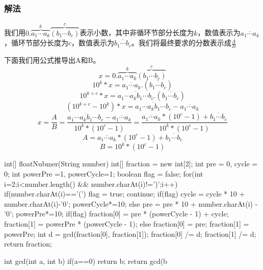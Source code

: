 \subsubsection{解法}

我们用$0.\overbrace{a_1 \cdots a_k}^{k} \overbrace{(b_1 \cdots b_c)}^{c}$表示小数，其中非循环节部分长度为$k$，数值表示为$\overline{a_1 \cdots a_k}$，循环节部分长度为$c$，数值表示为$\overline{b_1 \cdots b_c}$。我们将最终要求的分数表示成$\frac{A}{B}$

下面我们用公式推导出A和B。
\[ x = 0.\overbrace{a_1 \cdots a_k}^{k} \overbrace{(b_1 \cdots b_c)}^{c}  \]
\[ 10^k*x = \overline{a_1 \cdots a_k}.(\overline{b_1 \cdots b_c}) \]
\[ 10^{k+c}*x = \overline{a_1 \cdots a_kb_1 \cdots b_c}.(\overline{b_1 \cdots b_c}) \]
\[ (10^{k+c}-10^{k}) * x = \overline{a_1 \cdots a_kb_1 \cdots b_c}-\overline{a_1 \cdots a_k} \]
\[ x = \frac{A}{B} = \frac{\overline{a_1 \cdots a_kb_1 \cdots b_c}-\overline{a_1 \cdots a_k}}{10^k*(10^c-1)} = \frac{\overline{a_1 \cdots a_k}*(10^c-1) + \overline{b_1 \cdots b_c}}{10^k*(10^c-1)} \]
\[ A = \overline{a_1 \cdots a_k}*(10^c-1) + \overline{b_1 \cdots b_c} \]
\[ B = 10^k*(10^c-1) \]
\begin{Codex}[label={[$O(N)+O(1)$]Chap02_06_FloatNumber.java}]
int[] floatNubmer(String number) {
    int[] fraction = new int[2];
    int pre = 0, cycle = 0;
    int powerPre =1, powerCycle=1;
    boolean flag = false;
    for(int i=2;i<number.length() && number.charAt(i)!=')';i++) {
        if(number.charAt(i)=='(') {
            flag = true;
            continue;
        }
        if(flag) {
            cycle = cycle * 10 + number.charAt(i)-'0';
            powerCycle*=10;
         } else {
            pre = pre * 10 + number.charAt(i) - '0';
            powerPre*=10;
        }
    }
    if(flag) {
        fraction[0] = pre * (powerCycle - 1) + cycle;
        fraction[1] = powerPre * (powerCycle - 1);
    } else {
        fraction[0] = pre;
        fraction[1] = powerPre;
    }
    int d = gcd(fraction[0], fraction[1]);
    fraction[0] /= d;
    fraction[1] /= d;
    return fraction;
}

int gcd(int a, int b) {
    if(a==0) return b;
    return gcd(b%
}
\end{Codex}


